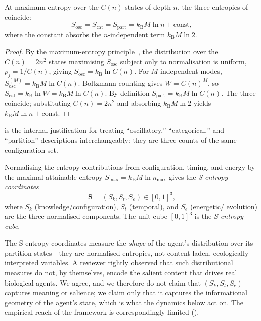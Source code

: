 \documentclass[11pt,twocolumn,a4paper]{article}
\newcommand{\Sk}{S_k}
\newcommand{\St}{S_t}
\newcommand{\Se}{S_e}
\newcommand{\Svec}{\mathbf{S}}
\newcommand{\kB}{k_{\mathrm{B}}}
\begin{document}
\begin{theorem}\label{thm:triple}
At maximum entropy over the $C(n)$ states of depth $n$, the three entropies of
 coincide:
\[
S_{\mathrm{osc}}=S_{\mathrm{cat}}=S_{\mathrm{part}}=\kB M\ln n+\text{const},
\]
where the constant absorbs the $n$-independent term $\kB M\ln 2$.
\end{theorem}

\begin{proof}
By the maximum-entropy principle~\cite{shannon1948,coverthomas2006}, the
distribution over the $C(n)=2n^2$ states maximising $S_{\mathrm{osc}}$ subject
only to normalisation is uniform, $p_j=1/C(n)$, giving
$S_{\mathrm{osc}}=\kB\ln C(n)$. For $M$ independent modes,
$S_{\mathrm{osc}}^{(M)}=\kB M\ln C(n)$. Boltzmann counting gives
$W=C(n)^M$, so $S_{\mathrm{cat}}=\kB\ln W=\kB M\ln C(n)$. By definition
$S_{\mathrm{part}}=\kB M\ln C(n)$. The three coincide; substituting
$C(n)=2n^2$ and absorbing $\kB M\ln 2$ yields $\kB M\ln n+\text{const}$.
\end{proof}

\begin{remark}
 is the internal justification for treating ``oscillatory,''
``categorical,'' and ``partition'' descriptions interchangeably: they are three
counts of the same configuration set.
\end{remark}

\begin{definition}\label{def:s-entropy}
Normalising the entropy contributions from configuration, timing, and energy by
the maximal attainable entropy $S_{\max}=\kB M\ln n_{\max}$ gives the
\emph{S-entropy coordinates}
\[
\Svec=(\Sk,\St,\Se)\in[0,1]^3,
\]
where $\Sk$ (knowledge/configuration), $\St$ (temporal), and $\Se$ (energetic/
evolution) are the three normalised components. The unit cube $[0,1]^3$ is the
\emph{S-entropy cube}.
\end{definition}

\begin{remark}
\label{rem:s-content}
The S-entropy coordinates measure the \emph{shape} of the agent's distribution
over its partition states---they are normalised entropies, not content-laden,
ecologically interpreted variables. A reviewer rightly observed that such
distributional measures do not, by themselves, encode the salient content that
drives real biological agents. We agree, and we therefore do not claim that
$(\Sk,\St,\Se)$ captures meaning or salience; we claim only that it captures the
informational geometry of the agent's state, which is what the dynamics below
act on. The empirical reach of the framework is correspondingly limited
().
\end{remark}
\end{document}
